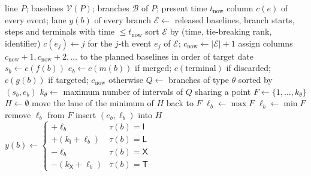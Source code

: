 \begin{algorithm}[tbp]
  \caption{HPB layout of one product line: ordinal columns and per-type
    lane partitioning.}
  \label{alg:layout}
  \small
  \begin{algorithmic}[1]
    \Require line $P$; baselines $\mathcal{V}(P)$; branches $\mathcal{B}$
      of $P$; present time $t_{\mathrm{now}}$
    \Ensure column $c(e)$ of every event; lane $y(b)$ of every branch
    \State $\mathcal{E} \gets$ released baselines, branch starts, steps and
      terminals with time $\le t_{\mathrm{now}}$
    \State sort $\mathcal{E}$ by (time, tie-breaking rank, identifier)
    \State $c(e_j) \gets j$ for the $j$-th event $e_j$ of $\mathcal{E}$;
      \quad $c_{\mathrm{now}} \gets |\mathcal{E}| + 1$
    \State assign columns $c_{\mathrm{now}}+1, c_{\mathrm{now}}+2, \dots$ to
      the planned baselines in order of target date
     \Comment{lane interval $[s_b, e_b)$}
      \State $s_b \gets c(f(b))$
      \State $e_b \gets c(m(b))$ if merged; $c(\text{terminal})$ if
        discarded; $c(g(b))$ if targeted; $c_{\mathrm{now}}$ otherwise
    \EndFor
      \State $Q \gets$ branches of type $\theta$ sorted by $(s_b, e_b)$
      \State $k_\theta \gets$ maximum number of intervals of $Q$ sharing a
        point 
      \State $F \gets \{1, \dots, k_\theta\}$ 
      \State $H \gets \emptyset$ 
          \State move the lane of the minimum of $H$ back to $F$
        \EndWhile
          \State $\ell_b \gets \max F$ 
        \Else
          \State $\ell_b \gets \min F$ 
        \EndIf
        \State remove $\ell_b$ from $F$
        \State insert $(e_b, \ell_b)$ into $H$
      \EndFor
    \EndFor
     
      \State $y(b) \gets
        \begin{cases}
          +\ell_b & \tau(b) = \mathsf{I}\\
          +(k_{\mathsf{I}} + \ell_b) & \tau(b) = \mathsf{L}\\
          -\ell_b & \tau(b) = \mathsf{X}\\
          -(k_{\mathsf{X}} + \ell_b) & \tau(b) = \mathsf{T}
        \end{cases}$
    \EndFor
  \end{algorithmic}
\end{algorithm}

